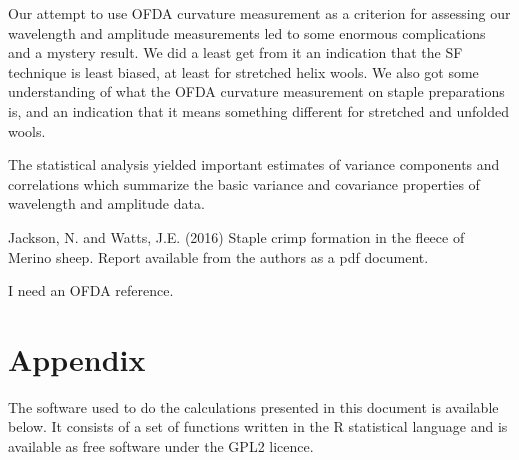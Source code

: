 \documentclass[titlepage,10pt]{article}  %
\begin{document}
Our attempt to use OFDA curvature measurement as a criterion for assessing our wavelength and amplitude measurements led to some enormous complications and a mystery result. We did a least get from it an indication that the SF technique is least biased, at least for stretched helix wools. We also got some understanding of what the OFDA curvature measurement on staple preparations is, and an indication that it means something different for stretched and unfolded wools.

The statistical analysis yielded important estimates of variance components and correlations which summarize the basic variance and covariance  properties of wavelength and amplitude data. 




\begin{thebibliography}{99}

Jackson, N. and Watts, J.E. (2016) Staple crimp formation in the fleece of Merino sheep. Report available from the authors as a pdf document.

I need an OFDA reference.

\end{thebibliography}


\appendix
\section{Appendix}
The software used to do the calculations presented in this document is available below. It consists of a set of functions written in the R statistical language and is available as free software under the GPL2 licence.
\end{document}
